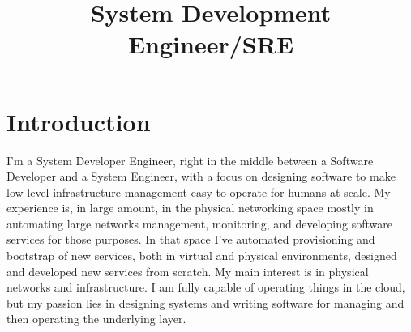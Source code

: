 \documentclass[11pt,a4paper,sans]{moderncv}        %
\title{System Development Engineer/SRE}                               %
\begin{document}
\makecvtitle

\section{Introduction}
I'm a System Developer Engineer, right in the middle between a Software Developer and a System Engineer, with a focus on designing software to make low level infrastructure management easy to operate for humans at scale.\newline{}
My experience is, in large amount, in the physical networking space mostly in automating large networks management, monitoring, and developing software services for those purposes.\newline{}
In that space I've automated provisioning and bootstrap of new services, both in virtual and physical environments, designed and developed new services from scratch.\newline{}
My main interest is in physical networks and infrastructure. I am fully capable of operating things in the cloud, but my passion lies in designing systems and writing software for managing and then operating the underlying layer.
\end{document}
